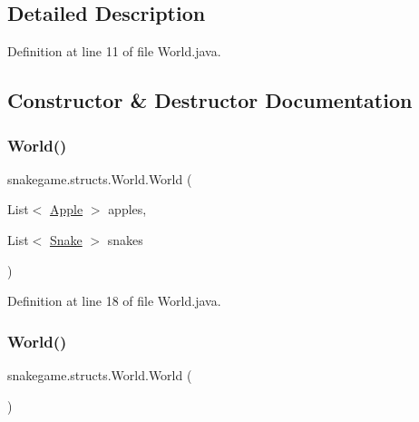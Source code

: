 \subsection{Detailed Description}


Definition at line 11 of file World.\+java.



\subsection{Constructor \& Destructor Documentation}
\mbox{\label{classsnakegame_1_1structs_1_1_world_a5ae70562a085bef9fe1f6c718fae1385}} 
\subsubsection{\texorpdfstring{World()}{World()}\hspace{0.1cm}{\footnotesize\ttfamily [1/2]}}
{\footnotesize\ttfamily snakegame.\+structs.\+World.\+World (\begin{DoxyParamCaption}\item[{List$<$ \mbox{\hyperlink{classsnakegame_1_1structs_1_1_apple}{Apple}} $>$}]{apples,  }\item[{List$<$ \mbox{\hyperlink{classsnakegame_1_1structs_1_1_snake}{Snake}} $>$}]{snakes }\end{DoxyParamCaption})}



Definition at line 18 of file World.\+java.

\mbox{\label{classsnakegame_1_1structs_1_1_world_ae2e3d1b007bf6a7dc55fb38443719abb}} 
\subsubsection{\texorpdfstring{World()}{World()}\hspace{0.1cm}{\footnotesize\ttfamily [2/2]}}
{\footnotesize\ttfamily snakegame.\+structs.\+World.\+World (\begin{DoxyParamCaption}{ }\end{DoxyParamCaption})}



